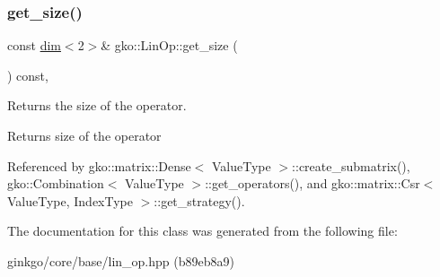 \subsubsection{\texorpdfstring{get\+\_\+size()}{get\_size()}}
{\footnotesize\ttfamily const \hyperlink{structgko_1_1dim}{dim}$<$2$>$\& gko\+::\+Lin\+Op\+::get\+\_\+size (\begin{DoxyParamCaption}{ }\end{DoxyParamCaption}) const\hspace{0.3cm}{\ttfamily [inline]}, {\ttfamily [noexcept]}}



Returns the size of the operator. 

\begin{DoxyReturn}{Returns}
size of the operator 
\end{DoxyReturn}


Referenced by gko\+::matrix\+::\+Dense$<$ Value\+Type $>$\+::create\+\_\+submatrix(), gko\+::\+Combination$<$ Value\+Type $>$\+::get\+\_\+operators(), and gko\+::matrix\+::\+Csr$<$ Value\+Type, Index\+Type $>$\+::get\+\_\+strategy().



The documentation for this class was generated from the following file\+:\begin{DoxyCompactItemize}
\item 
ginkgo/core/base/lin\+\_\+op.\+hpp (b89eb8a9)\end{DoxyCompactItemize}
